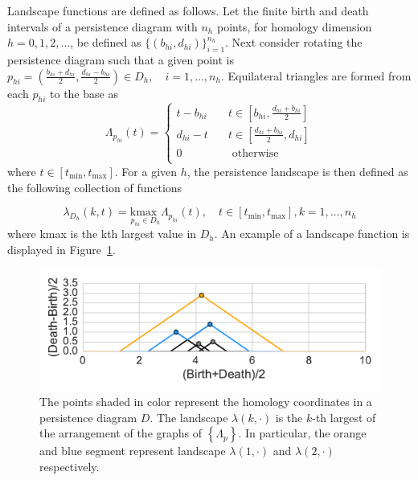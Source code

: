\documentclass[12pt]{article}
\begin{document}
Landscape functions are defined as follows.  Let the finite birth and death intervals of a persistence diagram with $n_h$ points, for homology dimension $h = 0, 1, 2, \ldots$, be defined as $\{(b_{hi},d_{hi})\}_{i = 1}^{n_h}$.  Next consider rotating the persistence diagram such that a given point is $p_{hi} = \left(\frac{b_{hi}+d_{hi}}{2}, \frac{d_{hi}-b_{hi}}{2}\right) \in D_h, \quad i = 1, \ldots, n_h$.  Equilateral triangles are formed from each $p_{hi}$ to the base as
\begin{equation*}
\Lambda_{p_{hi}}(t) =
  \begin{cases}
    t - b_{hi}  & \quad t \in [b_{hi}, \frac{d_{hi}+b_{hi}}{2}]\\
    d_{hi} - t  & \quad t \in [\frac{d_{hi}+b_{hi}}{2}, d_{hi}]\\
    0  & \quad \text{ otherwise}\\
  \end{cases}
\end{equation*}
where $t \in [t_{\min}, t_{\max}]$. For a given $h$, the persistence landscape is then defined as the following collection of functions

\begin{equation*}
\lambda_{D_h}(k, t) = \underset{p_{hi}\in D_h}{\text{kmax }} \Lambda_{p_{hi}}(t), \quad t \in [t_{\min}, t_{\max}], k = 1, \ldots, n_h
\end{equation*}
where kmax is the kth largest value in $D_h$.  An example of a landscape function is displayed in Figure~\ref{fig:landscape}.

\begin{center}
\begin{figure}[htp!]
  \centering
  \includegraphics[width=0.6\linewidth]{figure_3_silh.pdf}
    \caption{ The points shaded in color represent the homology coordinates in a persistence diagram $D$. The landscape $\lambda(k, \cdot)$ is the $k$-th largest of the arrangement of the graphs of $\left \{ \Lambda_{p} \right \}$. In particular, the orange and blue segment represent landscape $\lambda(1, \cdot)$ and $\lambda(2, \cdot)$ respectively.}
    \label{fig:landscape}
\end{figure}
\end{center}
\end{document}
